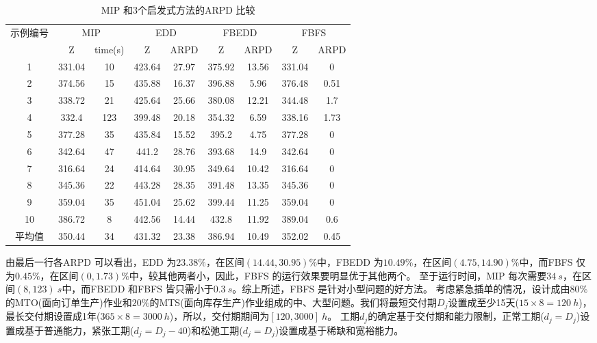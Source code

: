 \begin{table}[h]
  \centering\xiaowu
  \caption{MIP 和3个启发式方法的ARPD 比较\label{tab:comparisonforarpd}}
    \begin{tabular}{ccccccccc}
    \toprule
    \multirow{2}[4]{*}{示例编号} & \multicolumn{2}{c}{MIP} & \multicolumn{2}{c}{EDD} & \multicolumn{2}{c}{FBEDD} & \multicolumn{2}{c}{FBFS} \\
   \cline{2-9}
          & Z     & time(s) & Z     & ARPD  & Z     & ARPD  & Z     & ARPD \\
      \midrule
    1     & 331.04 & 10    & 423.64 & 27.97 & 375.92 & 13.56 & 331.04 & 0 \\
    2     & 374.56 & 15    & 435.88 & 16.37 & 396.88 & 5.96  & 376.48 & 0.51 \\
    3     & 338.72 & 21    & 425.64 & 25.66 & 380.08 & 12.21 & 344.48 & 1.7 \\
    4     & 332.4 & 123   & 399.48 & 20.18 & 354.32 & 6.59  & 338.16 & 1.73 \\
    5     & 377.28 & 35    & 435.84 & 15.52 & 395.2 & 4.75  & 377.28 & 0 \\
    6     & 342.64 & 47    & 441.2 & 28.76 & 393.68 & 14.9  & 342.64 & 0 \\
    7     & 316.64 & 24    & 414.64 & 30.95 & 349.64 & 10.42 & 316.64 & 0 \\
    8     & 345.36 & 22    & 443.28 & 28.35 & 391.48 & 13.35 & 345.36 & 0 \\
    9     & 359.04 & 35    & 451.04 & 25.62 & 399.44 & 11.25 & 359.04 & 0 \\
    10    & 386.72 & 8     & 442.56 & 14.44 & 432.8 & 11.92 & 389.04 & 0.6 \\[3pt]
    平均值   & 350.44 & 34    & 431.32 & 23.38 & 386.94 & 10.49 & 352.02 & 0.45 \\
    \bottomrule
    \end{tabular}
\end{table}
由最后一行各ARPD 可以看出，EDD 为$23.38\%$，在区间$(14.44,30.95)\%$中，FBEDD 为$10.49\%$，在区间$(4.75,14.90)\%$中，而FBFS 仅为$0.45\%$，在区间$(0,1.73)\%$中，较其他两者小，因此，FBFS 的运行效果要明显优于其他两个。
至于运行时间，MIP 每次需要$34\ s$，在区间$(8,123)\ s$中，而FBEDD 和FBFS 皆只需小于$0.3\ s$。综上所述，FBFS 是针对小型问题的好方法。
考虑紧急插单的情况，设计成由$80\%$的MTO(面向订单生产)作业和$20\%$的MTS(面向库存生产)作业组成的中、大型问题。我们将最短交付期$D_j$设置成至少15天($15\times 8 = 120\ h$)，最长交付期设置成1年($365\times 8 = 3000\ h$)，所以，交付期期间为$[120,3000]\ h$。
工期$d_j$的确定基于交付期和能力限制，正常工期($d_j = D_j$)设置成基于普通能力，紧张工期($d_j = D_j - 40$)和松弛工期($d_j = D_j$)设置成基于稀缺和宽裕能力。

